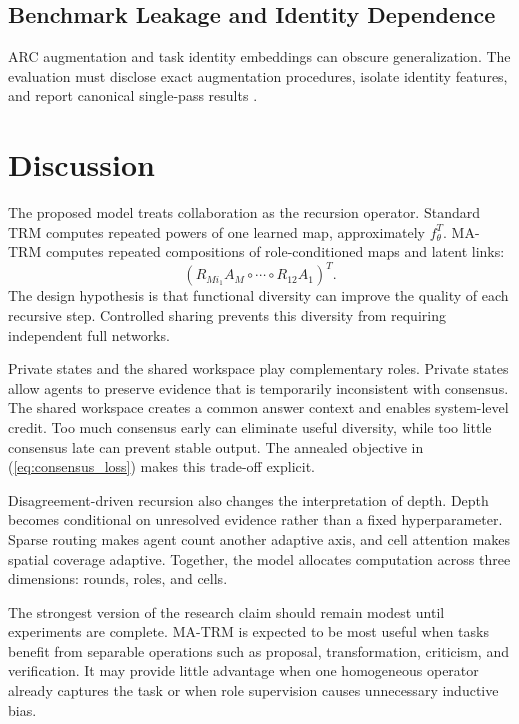 \documentclass[10pt,a4paper,twocolumn]{article}
\newcommand{\MA}{\textsc{MA-TRM}}
\begin{document}
\subsection{Benchmark Leakage and Identity Dependence}
ARC augmentation and task identity embeddings can obscure generalization. The evaluation must disclose exact augmentation procedures, isolate identity features, and report canonical single-pass results \cite{royeazar2025trmanalysis}.

\section{Discussion}
The proposed model treats collaboration as the recursion operator. Standard TRM computes repeated powers of one learned map, approximately $f_\theta^T$. \MA{} computes repeated compositions of role-conditioned maps and latent links:
\begin{equation}
\left(R_{Mi_1}A_M\circ\cdots\circ R_{12}A_1\right)^T. \label{eq:collaborative_operator}
\end{equation}
The design hypothesis is that functional diversity can improve the quality of each recursive step. Controlled sharing prevents this diversity from requiring independent full networks.

Private states and the shared workspace play complementary roles. Private states allow agents to preserve evidence that is temporarily inconsistent with consensus. The shared workspace creates a common answer context and enables system-level credit. Too much consensus early can eliminate useful diversity, while too little consensus late can prevent stable output. The annealed objective in (\ref{eq:consensus_loss}) makes this trade-off explicit.

Disagreement-driven recursion also changes the interpretation of depth. Depth becomes conditional on unresolved evidence rather than a fixed hyperparameter. Sparse routing makes agent count another adaptive axis, and cell attention makes spatial coverage adaptive. Together, the model allocates computation across three dimensions: rounds, roles, and cells.

The strongest version of the research claim should remain modest until experiments are complete. \MA{} is expected to be most useful when tasks benefit from separable operations such as proposal, transformation, criticism, and verification. It may provide little advantage when one homogeneous operator already captures the task or when role supervision causes unnecessary inductive bias.
\end{document}
